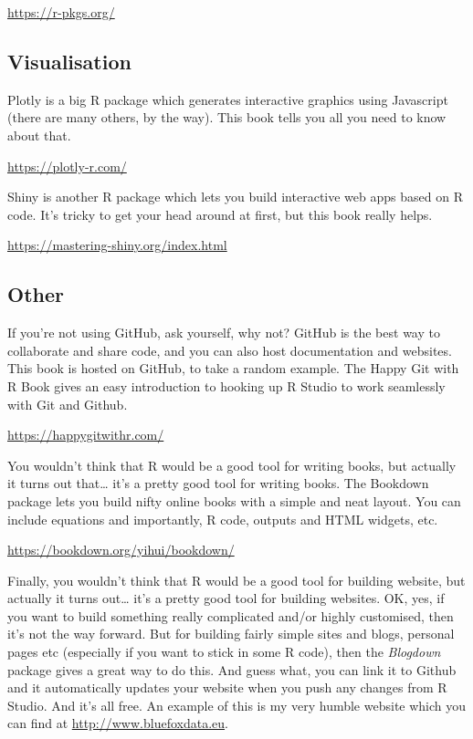 \documentclass[
]{book}
\begin{document}
\url{https://r-pkgs.org/}

\hypertarget{visualisation}{%
\subsection{Visualisation}\label{visualisation}}

Plotly is a big R package which generates interactive graphics using Javascript (there are many others, by the way). This book tells you all you need to know about that.

\url{https://plotly-r.com/}

Shiny is another R package which lets you build interactive web apps based on R code. It's tricky to get your head around at first, but this book really helps.

\url{https://mastering-shiny.org/index.html}

\hypertarget{other}{%
\subsection{Other}\label{other}}

If you're not using GitHub, ask yourself, why not? GitHub is the best way to collaborate and share code, and you can also host documentation and websites. This book is hosted on GitHub, to take a random example. The Happy Git with R Book gives an easy introduction to hooking up R Studio to work seamlessly with Git and Github.

\url{https://happygitwithr.com/}

You wouldn't think that R would be a good tool for writing books, but actually it turns out that\ldots{} it's a pretty good tool for writing books. The Bookdown package lets you build nifty online books with a simple and neat layout. You can include equations and importantly, R code, outputs and HTML widgets, etc.

\url{https://bookdown.org/yihui/bookdown/}

Finally, you wouldn't think that R would be a good tool for building website, but actually it turns out\ldots{} it's a pretty good tool for building websites. OK, yes, if you want to build something really complicated and/or highly customised, then it's not the way forward. But for building fairly simple sites and blogs, personal pages etc (especially if you want to stick in some R code), then the \emph{Blogdown} package gives a great way to do this. And guess what, you can link it to Github and it automatically updates your website when you push any changes from R Studio. And it's all free. An example of this is my very humble website which you can find at \url{http://www.bluefoxdata.eu}.
\end{document}
